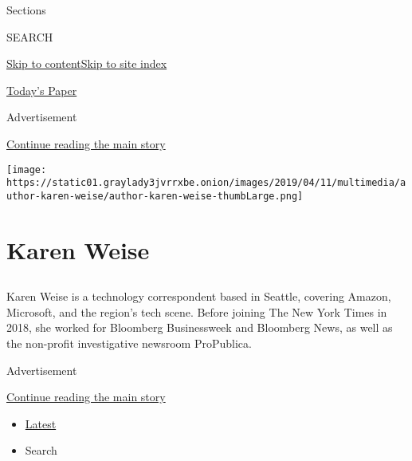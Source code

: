 Sections

SEARCH

\protect\hyperlink{site-content}{Skip to
content}\protect\hyperlink{site-index}{Skip to site index}

\href{https://myaccount.nytimes3xbfgragh.onion/auth/login?response_type=cookie\&client_id=vi}{}

\href{https://www.nytimes3xbfgragh.onion/section/todayspaper}{Today's
Paper}

Advertisement

\protect\hyperlink{after-top}{Continue reading the main story}

\texttt{[image: https://static01.graylady3jvrrxbe.onion/images/2019/04/11/multimedia/author-karen-weise/author-karen-weise-thumbLarge.png]}

\hypertarget{karen-weise}{%
\section{Karen Weise}\label{karen-weise}}

\subsection{}

Karen Weise is a technology correspondent based in Seattle, covering
Amazon, Microsoft, and the region's tech scene. Before joining The New
York Times in 2018, she worked for Bloomberg Businessweek and Bloomberg
News, as well as the non-profit investigative newsroom ProPublica.

Advertisement

\protect\hyperlink{after-mid1}{Continue reading the main story}

\begin{itemize}
\tightlist
\item
  \protect\hyperlink{stream-panel}{Latest}
\item
  Search
\end{itemize}

